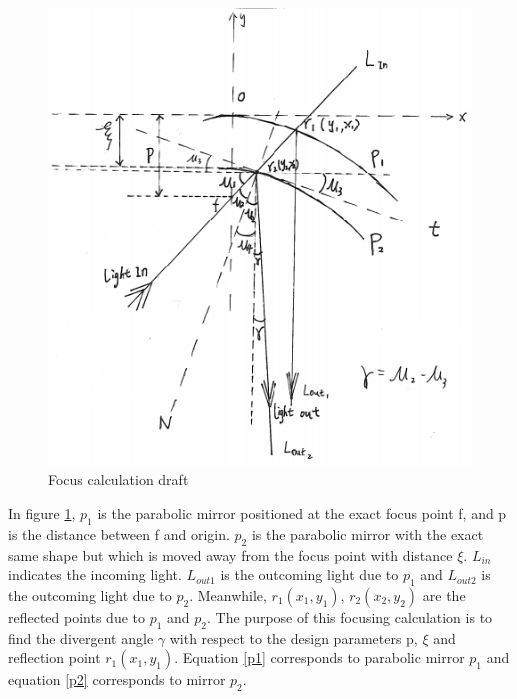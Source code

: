 \begin{figure}[ht!]
\centering
\includegraphics[scale = 1.1]{chapters/img/focus.png}
\caption{Focus calculation draft}
\label{fig:focus}
\end{figure}

In figure \ref{fig:focus}, $p_{1}$ is the parabolic mirror positioned at the exact focus point f, and p is the distance between f and origin. $p_{2}$ is the parabolic mirror with the exact same shape but which is moved away from the focus point with distance $\xi$. $L_{in}$ indicates the incoming light. $L_{out1}$ is the outcoming light due to $p_{1}$ and $L_{out2}$ is the outcoming light due to $p_{2}$. Meanwhile, $r_{1}(x_{1}, y_{1})$, $r_{2}(x_{2}, y_{2})$ are the reflected points due to $p_{1}$ and $p_{2}$. The purpose of this focusing calculation is to find the divergent angle $\gamma$ with respect to the design parameters p, $\xi$ and reflection point $r_{1}(x_{1}, y_{1}) $\cite{parabolic_wiki}. Equation \ref{p1} corresponds to parabolic mirror $p_{1}$ and equation \ref{p2} corresponds to mirror $p_{2}$. 

